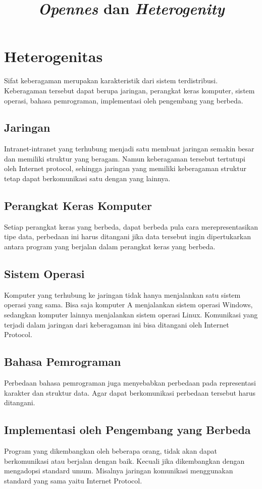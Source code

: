 \documentclass[12pt,a4paper]{apa}
\title{\textbf{\textit{Opennes} dan \textit{Heterogenity}}}
\begin{document}
	\maketitle
	\section{Heterogenitas}
	Sifat keberagaman merupakan karakteristik dari sistem terdistribusi. Keberagaman tersebut dapat berupa jaringan, perangkat keras komputer, sistem operasi, bahasa pemrograman, implementasi oleh pengembang yang berbeda. \cite{Coulouris2012} \cite{Belapurkar2009}
	\subsection{Jaringan}
	Intranet-intranet yang terhubung menjadi satu membuat jaringan semakin besar dan memiliki struktur yang beragam. Namun keberagaman tersebut tertutupi oleh Internet protocol, sehingga jaringan yang memiliki keberagaman struktur tetap dapat berkomunikasi satu dengan yang lainnya. \cite{Coulouris2012}
	\subsection{Perangkat Keras Komputer}
	Setiap perangkat keras yang berbeda, dapat berbeda pula cara merepresentasikan tipe data, perbedaan ini harus ditangani jika data tersebut ingin dipertukarkan antara program yang berjalan dalam perangkat keras yang berbeda. \cite{Coulouris2012}
	\subsection{Sistem Operasi}
	Komputer yang terhubung ke jaringan tidak hanya menjalankan satu sistem operasi yang sama. Bisa saja komputer A menjalankan sistem operasi Windows, sedangkan komputer lainnya menjalankan sistem operasi Linux. Komunikasi yang terjadi dalam jaringan dari keberagaman ini bisa ditangani oleh Internet Protocol. \cite{Coulouris2012}
	\subsection{Bahasa Pemrograman}
	Perbedaan bahasa pemrograman juga menyebabkan perbedaan pada representasi karakter dan struktur data. Agar dapat berkomunikasi perbedaan tersebut harus ditangani. \cite{Coulouris2012}
	\subsection{Implementasi oleh Pengembang yang Berbeda}
	Program yang dikembangkan oleh beberapa orang, tidak akan dapat berkomunikasi atau berjalan dengan baik. Kecuali jika dikembangkan dengan mengadopsi standard umum. Misalnya jaringan komunikasi menggunakan standard yang sama yaitu Internet Protocol.
\end{document}

